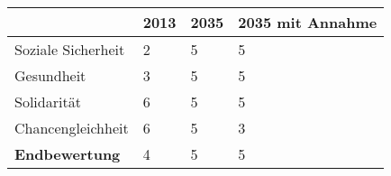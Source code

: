 \begin{table}[]
    \begin{tabular}{l|lll} & \textbf{2013} & \textbf{2035} &  \textbf{2035 mit Annahme} 
        \\ \hline Soziale Sicherheit    & 2  & 5  & 5
        \\ Gesundheit                   & 3  & 5  & 5
        \\ Solidarität                  & 6  & 5  & 5
        \\ Chancengleichheit            & 6  & 5  & 3
        \\ \hline \textbf{Endbewertung} & 4  & 5  & 5
    \end{tabular}
\end{table}
